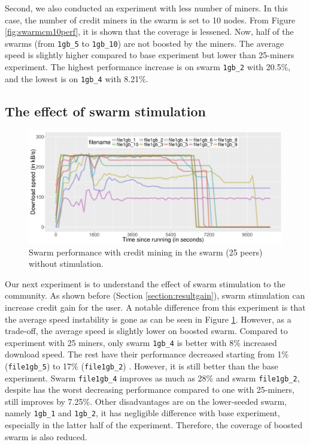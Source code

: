 Second, we also conducted an experiment with less number of miners. In this case, the number of credit miners in the swarm is set to 10 nodes. From Figure \ref{fig:swarmcm10perf}, it is shown that the coverage is lessened. Now, half of the swarms (from \texttt{1gb\_5} to \texttt{1gb\_10}) are not boosted by the miners. The average speed is slightly higher compared to base experiment but lower than 25-miners experiment. The highest performance increase is on swarm \texttt{1gb\_2} with 20.5\%, and the lowest is on \texttt{1gb\_4} with 8.21\%.


\subsection{The effect of swarm stimulation}
\begin{figure}[h!]
	\centering
	\includegraphics[width=\textwidth]{pics/results/swperf_sc1_notrig.png}
	\caption{Swarm performance with credit mining in the swarm (25 peers) without stimulation.}
	\label{fig:swarmcm25perfnotrig}
\end{figure}

Our next experiment is to understand the effect of swarm stimulation to the community. As shown before (Section \ref{section:resultgain}), swarm stimulation can increase credit gain for the user. A notable difference from this experiment is that the average speed instability is gone as can be seen in Figure \ref{fig:swarmcm25perfnotrig}. However, as a trade-off, the average speed is slightly lower on boosted swarm. Compared to experiment with 25 miners, only swarm \texttt{1gb\_4} is better with 8\% increased download speed. The rest have their performance decreased starting from 1\% (\texttt{file1gb\_5}) to 17\% (\texttt{file1gb\_2}) . However, it is still better than the base experiment. Swarm \texttt{file1gb\_4} improves as much as 28\% and swarm \texttt{file1gb\_2}, despite has the worst decreasing performance compared to one with 25-miners, still improves by 7.25\%. Other disadvantages are on the lower-seeded swarm, namely \texttt{1gb\_1} and \texttt{1gb\_2}, it has negligible difference with base experiment, especially in the latter half of the experiment. Therefore, the coverage of boosted swarm is also reduced. 


